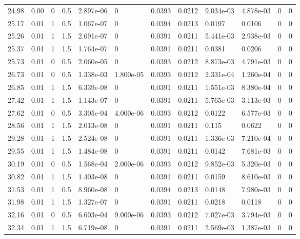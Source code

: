 \documentclass[preview]{standalone}
\begin{document}
{{{\begin{tabular}{L{1.2cm}C{1.2cm} C{0.3cm}C{0.5cm} C{1.4cm}C{1.4cm} C{1.4cm}C{1.4cm} C{1.6cm}C{1.6cm} C{1.6cm}C{1.6cm}}
  24.98  &  0.00  & 0     & 0.5 &  2.897e-06  & 0  &  0.0393&   0.0212& 9.034e-03 & 4.878e-03   &  0 & 0  \\ 
  25.17  &  0.01  & 1     & 0.5 &  1.067e-07  & 0  &  0.0394&   0.0213& 0.0197 & 0.0106   &  0 & 0  \\ 
  25.26  &  0.01  & 1     & 1.5 &  2.691e-07  & 0  &  0.0391&   0.0211& 5.441e-03 & 2.938e-03   &  0 & 0  \\ 
  25.37  &  0.01  & 1     & 1.5 &  1.764e-07  & 0  &  0.0391&   0.0211& 0.0381 & 0.0206   &  0 & 0  \\ 
  25.73  &  0.01  & 0     & 0.5 &  2.060e-05  & 0  &  0.0393&   0.0212& 8.873e-03 & 4.791e-03   &  0 & 0  \\ 
  26.73  &  0.01  & 0     & 0.5 &  1.338e-03  & 1.800e-05  &  0.0393&   0.0212& 2.331e-04 & 1.260e-04   &  0 & 0  \\ 
  26.85  &  0.01  & 1     & 1.5 &  6.339e-08  & 0  &  0.0391&   0.0211& 1.551e-03 & 8.380e-04   &  0 & 0  \\ 
  27.42  &  0.01  & 1     & 1.5 &  1.143e-07  & 0  &  0.0391&   0.0211& 5.765e-03 & 3.113e-03   &  0 & 0  \\ 
  27.62  &  0.01  & 0     & 0.5 &  3.305e-04  & 4.000e-06  &  0.0393&   0.0212& 0.0122 & 6.577e-03   &  0 & 0  \\ 
  28.56  &  0.01  & 1     & 1.5 &  2.013e-08  & 0  &  0.0391&   0.0211& 0.115 & 0.0622   &  0 & 0  \\ 
  29.28  &  0.01  & 1     & 1.5 &  2.524e-08  & 0  &  0.0391&   0.0211& 1.336e-03 & 7.210e-04   &  0 & 0  \\ 
  29.55  &  0.01  & 1     & 1.5 &  1.484e-08  & 0  &  0.0391&   0.0211& 0.0142 & 7.681e-03   &  0 & 0  \\ 
  30.19  &  0.01  & 0     & 0.5 &  1.568e-04  & 2.000e-06  &  0.0393&   0.0212& 9.852e-03 & 5.320e-03   &  0 & 0  \\ 
  30.82  &  0.01  & 1     & 1.5 &  1.403e-08  & 0  &  0.0391&   0.0211& 0.0159 & 8.610e-03   &  0 & 0  \\ 
  31.53  &  0.01  & 1     & 0.5 &  8.960e-08  & 0  &  0.0394&   0.0213& 0.0148 & 7.980e-03   &  0 & 0  \\ 
  31.98  &  0.01  & 1     & 1.5 &  1.327e-07  & 0  &  0.0391&   0.0211& 0.0218 & 0.0118   &  0 & 0  \\ 
  32.16  &  0.01  & 0     & 0.5 &  6.603e-04  & 9.000e-06  &  0.0393&   0.0212& 7.027e-03 & 3.794e-03   &  0 & 0  \\ 
  32.34  &  0.01  & 1     & 1.5 &  6.719e-08  & 0  &  0.0391&   0.0211& 2.569e-03 & 1.387e-03   &  0 & 0  \\ 

\end{tabular}}}}
\end{document}
